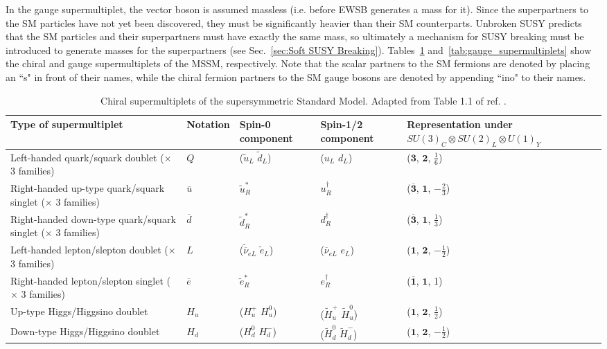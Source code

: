 \documentclass[dissertation.tex]{subfiles}
\begin{document}
In the gauge supermultiplet, the vector boson is assumed massless (i.e. before EWSB generates a mass for it).  Since the superpartners to the SM particles have not yet been discovered, they must be significantly heavier than their SM counterparts.  Unbroken SUSY predicts that the SM particles and their superpartners must have exactly the same mass, so ultimately a mechanism for SUSY breaking must be introduced to generate masses for the superpartners (see Sec.~\ref{sec:Soft SUSY Breaking}).  Tables~\ref{tab:chiral_supermultiplets} and~\ref{tab:gauge_supermultiplets} show the chiral and gauge supermultiplets of the MSSM, respectively.  Note that the scalar partners to the SM fermions are denoted by placing an ``s" in front of their names, while the chiral fermion partners to the SM gauge bosons are denoted by appending ``ino" to their names.

\begin{table}[htbp]
\caption{Chiral supermultiplets of the supersymmetric Standard Model.  Adapted from Table 1.1 of ref. \cite{SUSY_primer}.}
\begin{tabular}{|m{3cm}|m{2cm}|m{2cm}|m{2cm}|m{4cm}|}
\hline
Type of \newline supermultiplet & Notation & Spin-0 component & Spin-1/2 component & Representation under $SU(3)_{C} \otimes SU(2)_{L} \otimes U(1)_{Y}$ \\
\hline
\hline
Left-handed quark/squark doublet ($\times$ 3 families) & $Q$ & ($\widetilde{u}_{L}$ $\widetilde{d}_{L}$) & ($u_{L}$ $d_{L}$) & ($\mathbf{3}$, $\mathbf{2}$, $\frac{1}{6}$) \\
\hline
Right-handed up-type quark/squark singlet ($\times$ 3 families) & $\overline{u}$ & $\widetilde{u}_{R}^{*}$ & $u_{R}^{\dag}$ & ($\mathbf{\overline{3}}$, $\mathbf{1}$, $-\frac{2}{3}$) \\
\hline
Right-handed down-type quark/squark singlet ($\times$ 3 families) & $\overline{d}$ & $\widetilde{d}_{R}^{*}$ & $d_{R}^{\dag}$ & ($\mathbf{\overline{3}}$, $\mathbf{1}$, $\frac{1}{3}$) \\
\hline
Left-handed lepton/slepton doublet ($\times$ 3 families) & $L$ & ($\widetilde{\overline{\nu}}_{eL}$ $\widetilde{e}_{L}$) & ($\overline{\nu}_{eL}$ $e_{L}$) & ($\mathbf{1}$, $\mathbf{2}$, $-\frac{1}{2}$) \\
\hline
Right-handed lepton/slepton singlet ($\times$ 3 families) & $\overline{e}$ & $\widetilde{e}_{R}^{*}$ & $e_{R}^{\dag}$ & ($\mathbf{\overline{1}}$, $\mathbf{1}$, 1) \\
\hline
Up-type Higgs/Higgsino doublet & $H_{u}$ & ($H_{u}^{+}$ $H_{u}^{0}$) & ($\widetilde{H}_{u}^{+}$ $\widetilde{H}_{u}^{0}$) & ($\mathbf{1}$, $\mathbf{2}$, $\frac{1}{2}$) \\
\hline
Down-type Higgs/Higgsino doublet & $H_{d}$ & ($H_{d}^{0}$ $H_{d}^{-}$) & ($\widetilde{H}_{d}^{0}$ $\widetilde{H}_{d}^{-}$) & ($\mathbf{1}$, $\mathbf{2}$, $-\frac{1}{2}$) \\
\hline
\end{tabular}
\label{tab:chiral_supermultiplets}
\end{table}
\end{document}
